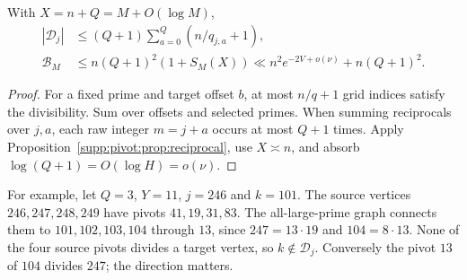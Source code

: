 \begin{proposition}\label{supp:pivot:prop:footprint}
With $X=n+Q=M+O(\log M)$,
\begin{align}
 |\mathscr D_j|&\le(Q+1)\sum_{a=0}^Q(n/q_{j,a}+1),\label{supp:pivot:eq:footprint-point}\\
 \mathscr B_M&\le n(Q+1)^2(1+S_M(X))
          \ll n^2e^{-2V+o(\nu)}+n(Q+1)^2.\label{supp:pivot:eq:footprint}
\end{align}
\end{proposition}
\begin{proof}
For a fixed prime and target offset $b$, at most $n/q+1$ grid indices satisfy the divisibility. Sum over offsets and selected primes. When summing reciprocals over $j,a$, each raw integer $m=j+a$ occurs at most $Q+1$ times. Apply Proposition~\ref{supp:pivot:prop:reciprocal}, use $X\asymp n$, and absorb $\log(Q+1)=O(\log H)=o(\nu)$.
\end{proof}

For example, let $Q=3$, $Y=11$, $j=246$ and $k=101$. The source vertices
$246,247,248,249$ have pivots $41,19,31,83$.
The all-large-prime graph connects them to $101,102,103,104$ through $13$, since
$247=13\cdot19$ and $104=8\cdot13$. None of the four source pivots divides a target vertex, so $k\notin\mathscr D_j$. Conversely the pivot $13$ of $104$ divides $247$; the direction matters.

